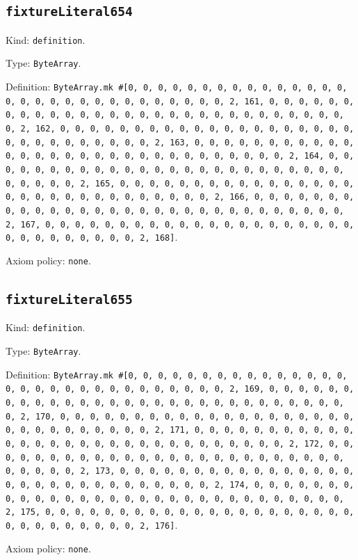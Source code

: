 \documentclass[11pt]{article}
\begin{document}
\subsection*{\texttt{fixtureLiteral654}}
\noindent Kind: \texttt{definition}.\par
\noindent Type: \texttt{ByteArray}.\par
\noindent Definition: \texttt{ByteArray.mk \#[0, 0, 0, 0, 0, 0, 0, 0, 0, 0, 0, 0, 0, 0, 0, 0, 0, 0, 0, 0, 0, 0, 0, 0, 0, 0, 0, 0, 0, 0, 2, 161, 0, 0, 0, 0, 0, 0, 0, 0, 0, 0, 0, 0, 0, 0, 0, 0, 0, 0, 0, 0, 0, 0, 0, 0, 0, 0, 0, 0, 0, 0, 2, 162, 0, 0, 0, 0, 0, 0, 0, 0, 0, 0, 0, 0, 0, 0, 0, 0, 0, 0, 0, 0, 0, 0, 0, 0, 0, 0, 0, 0, 0, 0, 2, 163, 0, 0, 0, 0, 0, 0, 0, 0, 0, 0, 0, 0, 0, 0, 0, 0, 0, 0, 0, 0, 0, 0, 0, 0, 0, 0, 0, 0, 0, 0, 2, 164, 0, 0, 0, 0, 0, 0, 0, 0, 0, 0, 0, 0, 0, 0, 0, 0, 0, 0, 0, 0, 0, 0, 0, 0, 0, 0, 0, 0, 0, 0, 2, 165, 0, 0, 0, 0, 0, 0, 0, 0, 0, 0, 0, 0, 0, 0, 0, 0, 0, 0, 0, 0, 0, 0, 0, 0, 0, 0, 0, 0, 0, 0, 2, 166, 0, 0, 0, 0, 0, 0, 0, 0, 0, 0, 0, 0, 0, 0, 0, 0, 0, 0, 0, 0, 0, 0, 0, 0, 0, 0, 0, 0, 0, 0, 2, 167, 0, 0, 0, 0, 0, 0, 0, 0, 0, 0, 0, 0, 0, 0, 0, 0, 0, 0, 0, 0, 0, 0, 0, 0, 0, 0, 0, 0, 0, 0, 2, 168]}.\par
\noindent Axiom policy: \texttt{none}.\par
\subsection*{\texttt{fixtureLiteral655}}
\noindent Kind: \texttt{definition}.\par
\noindent Type: \texttt{ByteArray}.\par
\noindent Definition: \texttt{ByteArray.mk \#[0, 0, 0, 0, 0, 0, 0, 0, 0, 0, 0, 0, 0, 0, 0, 0, 0, 0, 0, 0, 0, 0, 0, 0, 0, 0, 0, 0, 0, 0, 2, 169, 0, 0, 0, 0, 0, 0, 0, 0, 0, 0, 0, 0, 0, 0, 0, 0, 0, 0, 0, 0, 0, 0, 0, 0, 0, 0, 0, 0, 0, 0, 2, 170, 0, 0, 0, 0, 0, 0, 0, 0, 0, 0, 0, 0, 0, 0, 0, 0, 0, 0, 0, 0, 0, 0, 0, 0, 0, 0, 0, 0, 0, 0, 2, 171, 0, 0, 0, 0, 0, 0, 0, 0, 0, 0, 0, 0, 0, 0, 0, 0, 0, 0, 0, 0, 0, 0, 0, 0, 0, 0, 0, 0, 0, 0, 2, 172, 0, 0, 0, 0, 0, 0, 0, 0, 0, 0, 0, 0, 0, 0, 0, 0, 0, 0, 0, 0, 0, 0, 0, 0, 0, 0, 0, 0, 0, 0, 2, 173, 0, 0, 0, 0, 0, 0, 0, 0, 0, 0, 0, 0, 0, 0, 0, 0, 0, 0, 0, 0, 0, 0, 0, 0, 0, 0, 0, 0, 0, 0, 2, 174, 0, 0, 0, 0, 0, 0, 0, 0, 0, 0, 0, 0, 0, 0, 0, 0, 0, 0, 0, 0, 0, 0, 0, 0, 0, 0, 0, 0, 0, 0, 2, 175, 0, 0, 0, 0, 0, 0, 0, 0, 0, 0, 0, 0, 0, 0, 0, 0, 0, 0, 0, 0, 0, 0, 0, 0, 0, 0, 0, 0, 0, 0, 2, 176]}.\par
\noindent Axiom policy: \texttt{none}.\par
\end{document}
